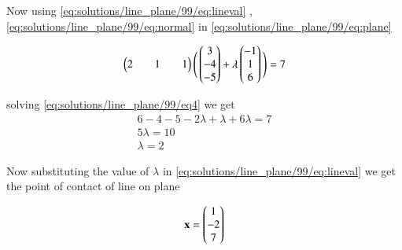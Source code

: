 Now using \eqref{eq:solutions/line_plane/99/eq:lineval} , \eqref{eq:solutions/line_plane/99/eq:normal}   in \eqref{eq:solutions/line_plane/99/eq:plane}

\begin{align}
\begin{pmatrix} 2 && 1 && 1\end{pmatrix} \Bigg( \begin{pmatrix}3 \\-4 \\-5\end{pmatrix}+\lambda\begin{pmatrix}-1 \\1 \\6\end{pmatrix} \Bigg)=7\label{eq:solutions/line_plane/99/eq4}
\end{align}

solving \eqref{eq:solutions/line_plane/99/eq4} we get 
\begin{align}  
6 -4 -5-2\lambda+ \lambda+ 6 \lambda=7 \\ 
5 \lambda=10 \\
\lambda=2 \label{eq:solutions/line_plane/99/eq5} 
\end{align}

Now substituting the value of $\lambda$ in \eqref{eq:solutions/line_plane/99/eq:lineval} we get the point of contact of line on plane


\begin{align}
\mathbf{x}=\begin{pmatrix}1\\-2\\7 \end{pmatrix}
\end{align}
